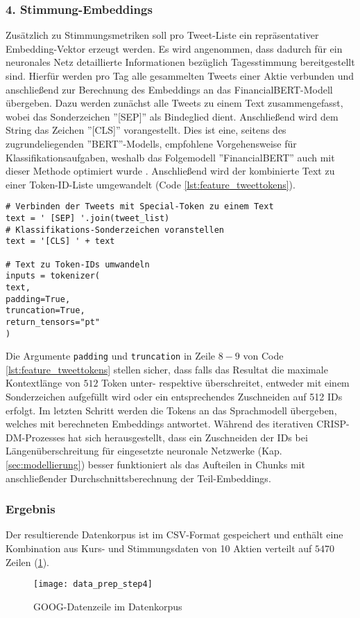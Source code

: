 \subsubsection*{4. Stimmung-Embeddings}
Zusätzlich zu Stimmungsmetriken soll pro Tweet-Liste ein repräsentativer Embedding-Vektor erzeugt werden. Es wird angenommen, dass dadurch für ein neuronales Netz detaillierte Informationen bezüglich Tagesstimmung bereitgestellt sind. Hierfür werden pro Tag alle gesammelten Tweets einer Aktie verbunden und anschließend zur Berechnung des Embeddings an das FinancialBERT-Modell übergeben.
Dazu werden zunächst alle Tweets zu einem Text zusammengefasst, wobei das Sonderzeichen ''[SEP]'' als Bindeglied dient. Anschließend wird dem String das Zeichen ''[CLS]'' vorangestellt. Dies ist eine, seitens des zugrundeliegenden ''BERT''-Modells, empfohlene Vorgehensweise für Klassifikationsaufgaben, weshalb das Folgemodell ''FinancialBERT'' auch mit dieser Methode optimiert wurde \autocite[Kap. 5.3]{hazourli2022financialbert}.
Anschließend wird der kombinierte Text zu einer Token-ID-Liste umgewandelt (Code \ref{lst:feature_tweettokens}). 
\begin{lstlisting}[caption={Umwandlung von Tweets zu Token-IDs}, label=lst:feature_tweettokens, captionpos=t]
# Verbinden der Tweets mit Special-Token zu einem Text
text = ' [SEP] '.join(tweet_list)
# Klassifikations-Sonderzeichen voranstellen
text = '[CLS] ' + text

# Text zu Token-IDs umwandeln
inputs = tokenizer(
text, 
padding=True, 
truncation=True, 
return_tensors="pt"
)
\end{lstlisting}
Die Argumente \texttt{padding} und \texttt{truncation} in Zeile $8-9$ von Code \ref{lst:feature_tweettokens} stellen sicher, dass falls das Resultat die maximale Kontextlänge von $512$ Token unter- respektive überschreitet, entweder mit einem Sonderzeichen aufgefüllt wird oder ein entsprechendes Zuschneiden auf 512 IDs erfolgt.
Im letzten Schritt werden die Tokens an das Sprachmodell übergeben, welches mit berechneten Embeddings antwortet.
Während des iterativen \ac{CRISP-DM}-Prozesses hat sich herausgestellt, dass ein Zuschneiden der IDs bei Längenüberschreitung für eingesetzte neuronale Netzwerke (Kap. \ref{sec:modellierung}) besser funktioniert als das Aufteilen in Chunks mit anschließender Durchschnittsberechnung der Teil-Embeddings.

\subsubsection*{Ergebnis}
Der resultierende Datenkorpus ist im \ac{CSV}-Format gespeichert und enthält eine Kombination aus Kurs- und Stimmungsdaten von 10 Aktien verteilt auf $5470$ Zeilen (\ref{fig:data_prep_step4}).
\begin{figure}[H]
	\texttt{[image: data\_prep\_step4]}
	\caption{GOOG-Datenzeile im Datenkorpus}
	\label{fig:data_prep_step4}
\end{figure}




